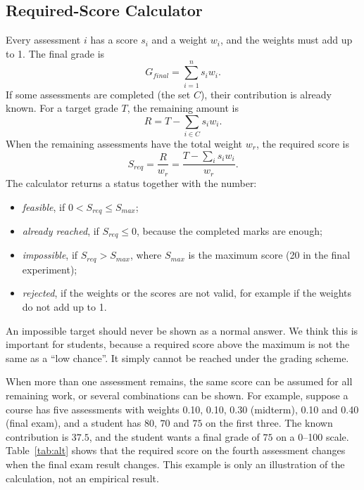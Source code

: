 \documentclass[10pt,twocolumn,a4paper]{article}
\begin{document}
\subsection{Required-Score Calculator}
Every assessment $i$ has a score $s_i$ and a weight $w_i$, and the weights must add up to 1. The final grade is
\begin{equation}
G_{final}=\sum_{i=1}^{n}s_i w_i .
\end{equation}
If some assessments are completed (the set $C$), their contribution is already known. For a target grade $T$, the remaining amount is
\begin{equation}
R = T-\sum_{i\in C}s_i w_i .
\end{equation}
When the remaining assessments have the total weight $w_r$, the required score is
\begin{equation}
S_{req}=\frac{R}{w_r}=\frac{T-\sum_i s_i w_i}{w_r}.
\end{equation}
The calculator returns a status together with the number:
\begin{itemize}
  \item \textit{feasible}, if $0 < S_{req} \le S_{max}$;
  \item \textit{already reached}, if $S_{req} \le 0$, because the completed marks are enough;
  \item \textit{impossible}, if $S_{req} > S_{max}$, where $S_{max}$ is the maximum score (20 in the final experiment);
  \item \textit{rejected}, if the weights or the scores are not valid, for example if the weights do not add up to 1.
\end{itemize}
An impossible target should never be shown as a normal answer. We think this is important for students, because a required score above the maximum is not the same as a ``low chance''. It simply cannot be reached under the grading scheme.

When more than one assessment remains, the same score can be assumed for all remaining work, or several combinations can be shown. For example, suppose a course has five assessments with weights 0.10, 0.10, 0.30 (midterm), 0.10 and 0.40 (final exam), and a student has $80$, $70$ and $75$ on the first three. The known contribution is $37.5$, and the student wants a final grade of $75$ on a 0--100 scale. Table~\ref{tab:alt} shows that the required score on the fourth assessment changes when the final exam result changes. This example is only an illustration of the calculation, not an empirical result.
\end{document}
